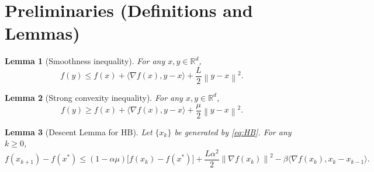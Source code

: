 \documentclass{article}
\newtheorem{lemma}{Lemma}
\newcommand{\R}{\mathbb{R}}
\newcommand{\norm}[1]{\left\lVert #1\right\rVert}
\newcommand{\ip}[2]{\langle #1,#2\rangle}
\newcommand{\grad}{\nabla}
\begin{document}
\section*{Preliminaries (Definitions and Lemmas)}
\begin{lemma}[Smoothness inequality]\label{lem:smooth}
For any $x,y\in\R^{d}$,
\[
f(y)\le f(x)+\ip{\grad f(x)}{y-x}+\frac{L}{2}\norm{y-x}^{2}.
\]
\end{lemma}
\begin{lemma}[Strong convexity inequality]\label{lem:strong}
For any $x,y\in\R^{d}$,
\[
f(y)\ge f(x)+\ip{\grad f(x)}{y-x}+\frac{\mu}{2}\norm{y-x}^{2}.
\]
\end{lemma}
\begin{lemma}[Descent Lemma for HB]\label{lem:descent}
Let $\{x_{k}\}$ be generated by \eqref{eq:HB}. For any $k\ge0$,
\[
f(x_{k+1})-f(x^{*})
\le (1-\alpha\mu)\bigl[f(x_{k})-f(x^{*})\bigr]
+\frac{L\alpha^{2}}{2}\norm{\grad f(x_{k})}^{2}
-\beta\ip{\grad f(x_{k})}{x_{k}-x_{k-1}}.
\]
\end{lemma}
\end{document}
